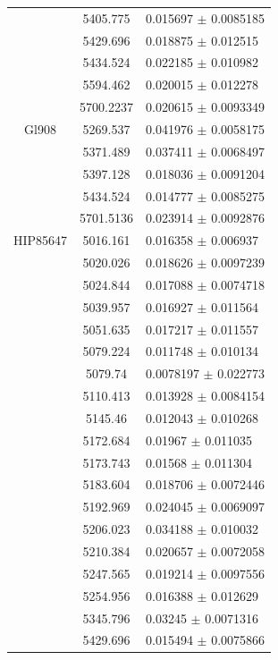 \begin{longtable}{|c|c|l|}
 & 5405.775 & 0.015697 $\pm$ 0.0085185 \\       
 & 5429.696 & 0.018875 $\pm$ 0.012515 \\        
 & 5434.524 & 0.022185 $\pm$ 0.010982 \\        
 & 5594.462 & 0.020015 $\pm$ 0.012278 \\        
 & 5700.2237 & 0.020615 $\pm$ 0.0093349 \\      
\hline                                          
Gl908 & 5269.537 & 0.041976 $\pm$ 0.0058175 \\  
 & 5371.489 & 0.037411 $\pm$ 0.0068497 \\       
 & 5397.128 & 0.018036 $\pm$ 0.0091204 \\       
 & 5434.524 & 0.014777 $\pm$ 0.0085275 \\       
 & 5701.5136 & 0.023914 $\pm$ 0.0092876 \\      
\hline                                          
HIP85647 & 5016.161 & 0.016358 $\pm$ 0.006937 \\
 & 5020.026 & 0.018626 $\pm$ 0.0097239 \\       
 & 5024.844 & 0.017088 $\pm$ 0.0074718 \\       
 & 5039.957 & 0.016927 $\pm$ 0.011564 \\        
 & 5051.635 & 0.017217 $\pm$ 0.011557 \\        
 & 5079.224 & 0.011748 $\pm$ 0.010134 \\        
 & 5079.74 & 0.0078197 $\pm$ 0.022773 \\        
 & 5110.413 & 0.013928 $\pm$ 0.0084154 \\       
 & 5145.46 & 0.012043 $\pm$ 0.010268 \\         
 & 5172.684 & 0.01967 $\pm$ 0.011035 \\         
 & 5173.743 & 0.01568 $\pm$ 0.011304 \\         
 & 5183.604 & 0.018706 $\pm$ 0.0072446 \\       
 & 5192.969 & 0.024045 $\pm$ 0.0069097 \\       
 & 5206.023 & 0.034188 $\pm$ 0.010032 \\        
 & 5210.384 & 0.020657 $\pm$ 0.0072058 \\       
 & 5247.565 & 0.019214 $\pm$ 0.0097556 \\       
 & 5254.956 & 0.016388 $\pm$ 0.012629 \\        
 & 5345.796 & 0.03245 $\pm$ 0.0071316 \\        
 & 5429.696 & 0.015494 $\pm$ 0.0075866 \\       

\end{longtable}
